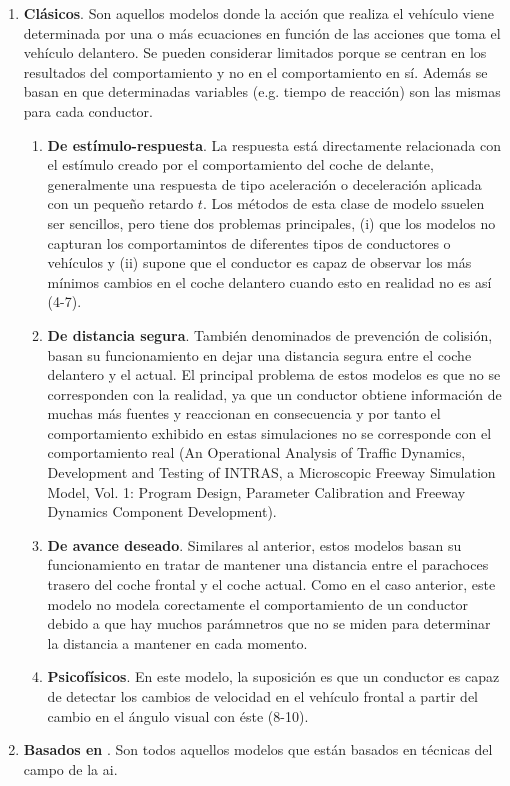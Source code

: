 \begin{enumerate}
	\item \textbf{Clásicos}. Son aquellos modelos donde la acción que realiza el vehículo viene determinada por una o más ecuaciones en función de las acciones que toma el vehículo delantero. Se pueden considerar limitados porque se centran en los resultados del comportamiento y no en el comportamiento en sí. Además se basan en que determinadas variables (e.g. tiempo de reacción) son las mismas para cada conductor.
	\begin{enumerate}
		\item \textbf{De estímulo-respuesta}. La respuesta está directamente relacionada con el estímulo creado por el comportamiento del coche de delante, generalmente una respuesta de tipo aceleración o deceleración aplicada con un pequeño retardo $t$. Los métodos de esta clase de modelo ssuelen ser sencillos, pero tiene dos problemas principales, (i) que los modelos no capturan los comportamintos de diferentes tipos de conductores o vehículos y (ii) supone que el conductor es capaz de observar los más mínimos cambios en el coche delantero cuando esto en realidad no es así (4-7).
		\item \textbf{De distancia segura}. También denominados de prevención de colisión, basan su funcionamiento en dejar una distancia segura entre el coche delantero y el actual. El principal problema de estos modelos es que no se corresponden con la realidad, ya que un conductor obtiene información de muchas más fuentes y reaccionan en consecuencia y por tanto el comportamiento exhibido en estas simulaciones no se corresponde con el comportamiento real (An Operational Analysis of Traffic Dynamics, Development and Testing of INTRAS, a Microscopic Freeway Simulation Model, Vol. 1: Program Design, Parameter Calibration and Freeway Dynamics Component Development).
		\item \textbf{De avance deseado}. Similares al anterior, estos modelos basan su funcionamiento en tratar de mantener una distancia entre el parachoces trasero del coche frontal y el coche actual. Como en el caso anterior, este modelo no modela corectamente el comportamiento de un conductor debido a que hay muchos parámnetros que no se miden para determinar la distancia a mantener en cada momento.
		\item \textbf{Psicofísicos}. En este modelo, la suposición es que un conductor es capaz de detectar los cambios de velocidad en el vehículo frontal a partir del cambio en el ángulo visual con éste (8-10).
	\end{enumerate}
	\item \textbf{Basados en }. Son todos aquellos modelos que están basados en técnicas del campo de la \acrshort{ai}.
\end{enumerate}


